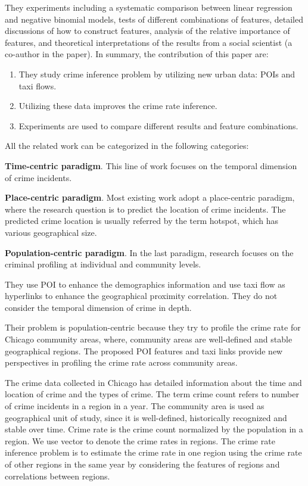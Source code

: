 \documentclass[11pt]{article}
\begin{document}
They experiments including a systematic comparison between linear regression and negative binomial models, tests of different combinations of features, detailed discussions of how to construct features, analysis of the relative importance of features, and theoretical interpretations of the results from a social scientist (a co-author in the paper). In summary, the contribution of this paper are: 
\begin{enumerate}

\item They study crime inference problem by utilizing new urban data: POIs and taxi flows. 

\item  Utilizing these data improves the crime rate inference. 

\item Experiments are used to compare different results and feature combinations. 
\end{enumerate}
All the related work can be categorized in the following categories:
\begin{description}
\item \textbf{Time-centric paradigm}. This line of work focuses on the temporal dimension of crime incidents.

\item \textbf{Place-centric paradigm}. Most existing work adopt a place-centric paradigm, where the research question is to predict the location of crime incidents. The predicted crime location is usually referred by the term hotspot, which has various geographical size.

\item \textbf{Population-centric paradigm}. In the last paradigm, research focuses on the criminal profiling at individual and community levels.

\end{description}

They use POI to enhance the demographics information and use taxi flow as hyperlinks to enhance the geographical proximity correlation.  They do not consider the temporal dimension of crime in depth.

Their problem is population-centric because they try to profile the crime rate for Chicago community areas, where, community areas are well-defined and stable geographical regions.  The proposed POI features and taxi links provide new perspectives in profiling the crime rate across community areas.

The crime data collected in Chicago has detailed information about the time and location of crime and the types of crime. The term crime count refers to number of crime incidents in a region in a year. The community area is used as geographical unit of study, since it is well-defined, historically recognized and stable over time. Crime rate is the crime count normalized by the population in a region. We use vector  to denote the crime rates in regions. The crime rate inference problem is to estimate the crime rate in one region using the crime rate of other regions in the same year by considering the features of regions and correlations between regions.
\end{document}
